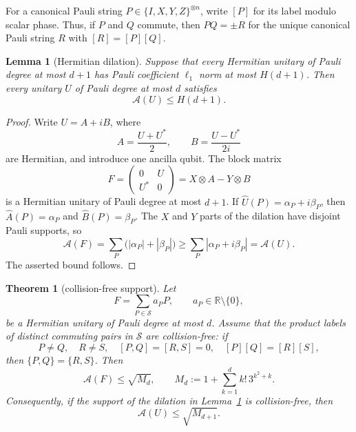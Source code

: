 \documentclass[11pt]{article}
\newtheorem{theorem}{Theorem}
\newtheorem{lemma}{Lemma}
\newcommand{\A}{\mathcal A}
\begin{document}
For a canonical Pauli string $P\in\{I,X,Y,Z\}^{\otimes n}$, write $[P]$ for
its label modulo scalar phase.  Thus, if $P$ and $Q$ commute, then
$PQ=\pm R$ for the unique canonical Pauli string $R$ with $[R]=[P][Q]$.

\begin{lemma}[Hermitian dilation]\label{lem:dilation}
Suppose that every Hermitian unitary of Pauli degree at most $d+1$ has Pauli
coefficient $\ell_1$ norm at most $H(d+1)$.  Then every unitary $U$ of Pauli
degree at most $d$ satisfies
\[
 \A(U)\le H(d+1).
\]
\end{lemma}

\begin{proof}
Write $U=A+iB$, where
\[
 A=\frac{U+U^*}{2},\qquad B=\frac{U-U^*}{2i}
\]
are Hermitian, and introduce one ancilla qubit.  The block matrix
\[
 F=\begin{pmatrix}0&U\\ U^*&0\end{pmatrix}
   =X\otimes A-Y\otimes B
\]
is a Hermitian unitary of Pauli degree at most $d+1$.  If
$\widehat U(P)=\alpha_P+i\beta_P$, then $\widehat A(P)=\alpha_P$ and
$\widehat B(P)=\beta_P$.  The $X$ and $Y$ parts of the dilation have disjoint
Pauli supports, so
\[
 \A(F)=\sum_P\bigl(|\alpha_P|+|\beta_P|\bigr)
 \ge \sum_P|\alpha_P+i\beta_P|=\A(U).
\]
The asserted bound follows.
\end{proof}

\begin{theorem}[collision-free support]\label{thm:collisionfree}
Let
\[
 F=\sum_{P\in\mathcal S}a_P P,\qquad a_P\in\mathbb R\setminus\{0\},
\]
be a Hermitian unitary of Pauli degree at most $d$.  Assume that the product
labels of distinct commuting pairs in $\mathcal S$ are collision-free: if
\[
 P\ne Q,\quad R\ne S,\quad [P,Q]=[R,S]=0,
 \quad [P][Q]=[R][S],
\]
then $\{P,Q\}=\{R,S\}$.  Then
\begin{equation}\label{eq:collisionbound}
 \A(F)\le \sqrt{M_d},\qquad
 M_d:=1+\sum_{k=1}^d k!\,3^{k^2+k}.
\end{equation}
Consequently, if the support of the dilation in Lemma~\ref{lem:dilation} is
collision-free, then
\[
 \A(U)\le\sqrt{M_{d+1}}.
\]
\end{theorem}
\end{document}
